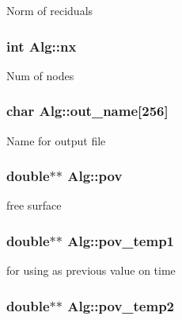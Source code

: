 \label{classAlg_a48f35bad3ab97c5bbabb1ecf572980e1}
Norm of reciduals \hypertarget{classAlg_a3d223cee974b6928608b0975e406bc5c}{
\subsubsection[{nx}]{\setlength{\rightskip}{0pt plus 5cm}int {\bf Alg::nx}}}
\label{classAlg_a3d223cee974b6928608b0975e406bc5c}
Num of nodes \hypertarget{classAlg_a57e8fa04c6ffb36bb472077251682493}{
\subsubsection[{out\_\-name}]{\setlength{\rightskip}{0pt plus 5cm}char {\bf Alg::out\_\-name}\mbox{[}256\mbox{]}}}
\label{classAlg_a57e8fa04c6ffb36bb472077251682493}
Name for output file \hypertarget{classAlg_a91da00f3e2a7cef949da58b242d9305e}{
\subsubsection[{pov}]{\setlength{\rightskip}{0pt plus 5cm}double$\ast$$\ast$ {\bf Alg::pov}}}
\label{classAlg_a91da00f3e2a7cef949da58b242d9305e}
free surface \hypertarget{classAlg_adcdeccfa46eb9907962373371a2adb6b}{
\subsubsection[{pov\_\-temp1}]{\setlength{\rightskip}{0pt plus 5cm}double$\ast$$\ast$ {\bf Alg::pov\_\-temp1}}}
\label{classAlg_adcdeccfa46eb9907962373371a2adb6b}
for using as previous value on time \hypertarget{classAlg_aa6628cd62bd2c1e14311dada7d35ed6e}{
\subsubsection[{pov\_\-temp2}]{\setlength{\rightskip}{0pt plus 5cm}double$\ast$$\ast$ {\bf Alg::pov\_\-temp2}}}
